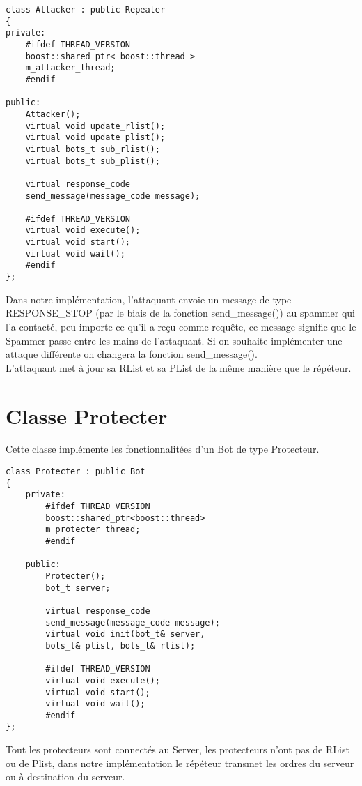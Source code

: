 \documentclass[11pt]{article}
\begin{document}
\begin{minipage}[c]{.46\linewidth}
\begin{verbatim} 
class Attacker : public Repeater
{
private:
	#ifdef THREAD_VERSION
	boost::shared_ptr< boost::thread > 
	m_attacker_thread;
	#endif

public:
	Attacker();
	virtual void update_rlist();
	virtual void update_plist();
	virtual bots_t sub_rlist();
	virtual bots_t sub_plist();
	
	virtual response_code 
	send_message(message_code message);
	
	#ifdef THREAD_VERSION
	virtual void execute();
	virtual void start();
	virtual void wait();
	#endif
};
\end{verbatim}	
\end{minipage} \hfill
\begin{minipage}[c]{.46\linewidth}
Dans notre implémentation, l'attaquant envoie un message de type RESPONSE\_STOP (par le biais de la fonction send\_message()) au spammer qui l'a contacté, peu importe ce qu'il a reçu comme requête, ce message signifie que le Spammer passe entre les mains de l'attaquant. Si on souhaite implémenter une attaque différente on changera la fonction send\_message().\\L'attaquant met à jour sa RList et sa PList de la même manière que le répéteur. 
\end{minipage}

\newpage
\section{Classe Protecter}
Cette classe implémente les fonctionnalitées d'un Bot de type Protecteur.\\

\begin{minipage}[c]{.46\linewidth}
\begin{verbatim} 
class Protecter : public Bot
{	
	private:
		#ifdef THREAD_VERSION
		boost::shared_ptr<boost::thread> 
		m_protecter_thread;
		#endif
		
	public:
		Protecter();
		bot_t server;
	
		virtual response_code 
		send_message(message_code message);
		virtual void init(bot_t& server, 
		bots_t& plist, bots_t& rlist);
		
		#ifdef THREAD_VERSION
		virtual void execute();
		virtual void start();
		virtual void wait();
		#endif
};
\end{verbatim}	
\end{minipage} \hfill
\begin{minipage}[c]{.46\linewidth}
Tout les protecteurs sont connectés au Server, les protecteurs n'ont pas de RList ou de Plist, dans notre implémentation le répéteur transmet les ordres du serveur ou à destination du serveur.
\end{minipage}
\end{document}
